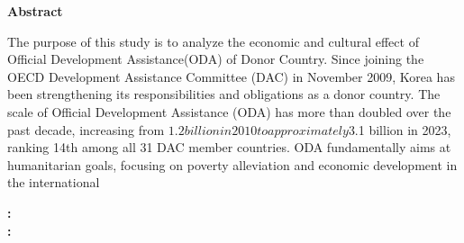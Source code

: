 
\begin{center}
  \begin{spacing}{1.5} %

    {\LARGE \bfseries Abstract} \par
    {\Huge \bfseries \maintitleen}

  \end{spacing}
\end{center}

\begin{flushright}
    \begin{spacing}{2}
        {\Large \authornameen} \par
        {\Large \affiliationen} \par
        {\Large \univen} \par
     \end{spacing}
\end{flushright}



The purpose of this study is to analyze the economic and cultural
effect of Official Development Assistance(ODA) of Donor Country.
Since joining the OECD Development Assistance Committee (DAC) in
November 2009, Korea has been strengthening its responsibilities and
obligations as a donor country. The scale of Official Development
Assistance (ODA) has more than doubled over the past decade,
increasing from $1.2 billion in 2010 to approximately $3.1 billion in
2023, ranking 14th among all 31 DAC member countries.
ODA fundamentally aims at humanitarian goals, focusing on
poverty alleviation and economic development in the international

\noindent
{}
\textbf{:}
\textbf{\abstractkeyworden}\\
\textbf{:}
\textbf{\studentnumber}\\

